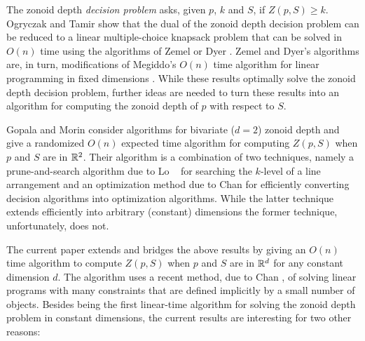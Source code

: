 \documentclass[lotsofwhite]{patmorin}
\begin{document}
The zonoid depth \emph{decision problem} asks, given $p$, $k$ and $S$,
if $Z(p,S)\ge k$. Ogryczak and Tamir \cite{ot03} show that the dual of
the zonoid depth decision problem can be reduced to a linear
multiple-choice knapsack problem that can be solved in $O(n)$ time
using the algorithms of Zemel \cite{z84} or Dyer \cite{d84}.  Zemel
and Dyer's algorithms are, in turn, modifications of Megiddo's $O(n)$
time algorithm for linear programming in fixed dimensions
\cite{m83,m84}.  While these results optimally solve the zonoid depth
decision problem, further ideas are needed to turn these results into
an algorithm for computing the zonoid depth of $p$ with respect to
$S$.

Gopala and Morin \cite{gm06} consider algorithms for bivariate ($d=2$)
zonoid depth and give a randomized $O(n)$ expected time algorithm for
computing $Z(p,S)$ when $p$ and $S$ are in $\mathbb{R}^2$.  Their algorithm is
a combination of two techniques, namely a prune-and-search algorithm
due to Lo \etal\ \cite{lms94} for searching the $k$-level of a line
arrangement and an optimization method due to Chan \cite{c99} for
efficiently converting decision algorithms into optimization
algorithms.   While the latter technique extends efficiently into
arbitrary (constant) dimensions \cite{c04} the former technique,
unfortunately, does not.

The current paper extends and bridges the above results by giving an
$O(n)$ time algorithm to compute $Z(p,S)$ when $p$ and $S$ are in
$\mathbb{R}^d$ for any constant dimension $d$.  The algorithm uses a recent
method, due to Chan \cite{c04}, of solving linear programs with many
constraints that are defined implicitly by a small number of objects.
Besides being the first linear-time algorithm for solving the zonoid
depth problem in constant dimensions, the current results are
interesting for two other reasons:
\end{document}

